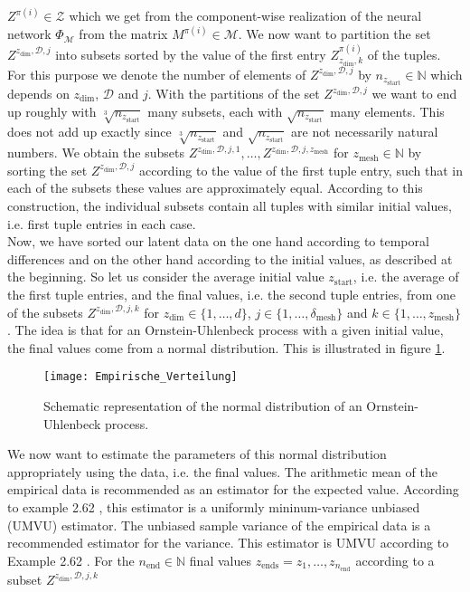 \documentclass[11pt,titlepage]{article}
\newcommand{\N}{\mathbb{N}} %
\theoremstyle{definition}
\theoremstyle{remark}
\begin{document}
	$Z^{\pi(i)}\in\mathcal{Z}$ which we get from the component-wise realization of the neural network $\Phi_\mathcal{M}$ from the matrix $M^{\pi(i)}\in\mathcal{M}$. We now want to partition the set $Z^{z_\mathrm{dim},\mathcal{D},j}$ into subsets sorted by the value of the first entry $Z_{z_\mathrm{dim},k}^{\pi(i)}$ of the tuples. For this purpose we denote the number of elements of $Z^{z_\mathrm{dim},\mathcal{D},j}$ by $n_{z_\mathrm{start}}\in\N$ which depends on $z_\mathrm{dim}$, $\mathcal{D}$ and $j$. With the partitions of the set $Z^{z_\mathrm{dim},\mathcal{D},j}$ we want to end up roughly with  $\sqrt[3]{n_{z_\mathrm{start}}}$ many subsets, each with $\sqrt{n_{z_\mathrm{start}}}$ many elements. This does not add up exactly since $\sqrt[3]{n_{z_\mathrm{start}}}$ and $\sqrt{n_{z_\mathrm{start}}}$ are not necessarily natural numbers.
	We obtain the subsets $Z^{z_\mathrm{dim},\mathcal{D},j,1},\ldots, Z^{z_\mathrm{dim},\mathcal{D},j,z_\mathrm{mesh}}$ for $z_\mathrm{mesh}\in\N$ by sorting the set $Z^{z_\mathrm{dim},\mathcal{D},j}$ according to the value of the first tuple entry, such that in each of the subsets these values are approximately equal. According to this construction, the individual subsets contain all tuples with similar initial values, i.e. first tuple entries in each case. \\
	Now, we have sorted our latent data on the one hand according to temporal differences and on the other hand according to the initial values, as described at the beginning. So let us consider the average initial value $z_\mathrm{start}$, i.e. the average of the first tuple entries, and the final values, i.e. the second tuple entries, from one of the subsets $Z^{z_\mathrm{dim},\mathcal{D},j, k}$ for $z_\mathrm{dim}\in\{1,\ldots,d\}$, $j\in\{1,\ldots,\delta_\mathrm{mesh}\}$ and $k\in\{1,\ldots,z_\mathrm{mesh}\}$. The idea is that for an Ornstein-Uhlenbeck process with a given initial value, the final values come from a normal distribution. This is illustrated in figure \ref{Abb Empirische Verteilung}.
	\begin{figure}[h!]
		\centering
		\texttt{[image: Empirische\_Verteilung]}
		\caption{Schematic representation of the normal distribution of an Ornstein-Uhlenbeck process.}
		\label{Abb Empirische Verteilung}
	\end{figure}
	We now want to estimate the parameters of this normal distribution appropriately using the data, i.e. the final values. The arithmetic mean of the empirical data is recommended as an estimator for the expected value. According to example 2.62 \cite{Hammerstein2021}, this estimator is a uniformly mininum-variance unbiased (UMVU) estimator. The unbiased sample variance of the empirical data is a recommended estimator for the variance. This estimator is UMVU according to Example 2.62 \cite{Hammerstein2021}. For the $n_\mathrm{end}\in\N$ final values $z_\mathrm{ends} =z_1,\ldots, z_{n_\mathrm{end}}$ according to a subset $Z^{z_\mathrm{dim},\mathcal{D},j,k}$ 
\end{document}

